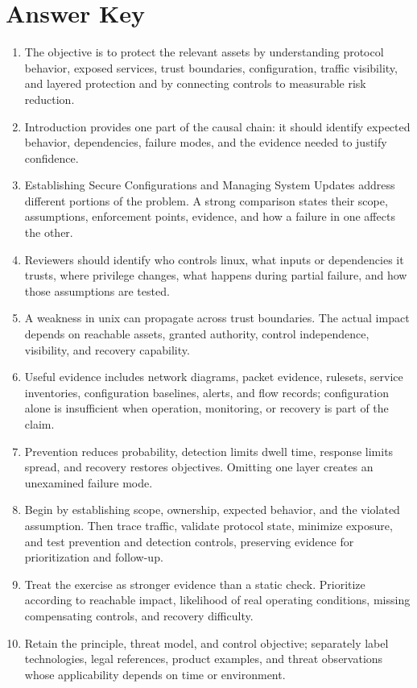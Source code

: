 \documentclass[11pt]{article}
\begin{document}
\section*{Answer Key}
\begin{enumerate}
\item The objective is to protect the relevant assets by understanding protocol behavior, exposed services, trust boundaries, configuration, traffic visibility, and layered protection and by connecting controls to measurable risk reduction.
\item Introduction provides one part of the causal chain: it should identify expected behavior, dependencies, failure modes, and the evidence needed to justify confidence.
\item Establishing Secure Configurations and Managing System Updates address different portions of the problem. A strong comparison states their scope, assumptions, enforcement points, evidence, and how a failure in one affects the other.
\item Reviewers should identify who controls linux, what inputs or dependencies it trusts, where privilege changes, what happens during partial failure, and how those assumptions are tested.
\item A weakness in unix can propagate across trust boundaries. The actual impact depends on reachable assets, granted authority, control independence, visibility, and recovery capability.
\item Useful evidence includes network diagrams, packet evidence, rulesets, service inventories, configuration baselines, alerts, and flow records; configuration alone is insufficient when operation, monitoring, or recovery is part of the claim.
\item Prevention reduces probability, detection limits dwell time, response limits spread, and recovery restores objectives. Omitting one layer creates an unexamined failure mode.
\item Begin by establishing scope, ownership, expected behavior, and the violated assumption. Then trace traffic, validate protocol state, minimize exposure, and test prevention and detection controls, preserving evidence for prioritization and follow-up.
\item Treat the exercise as stronger evidence than a static check. Prioritize according to reachable impact, likelihood of real operating conditions, missing compensating controls, and recovery difficulty.
\item Retain the principle, threat model, and control objective; separately label technologies, legal references, product examples, and threat observations whose applicability depends on time or environment.
\end{enumerate}
\end{document}
